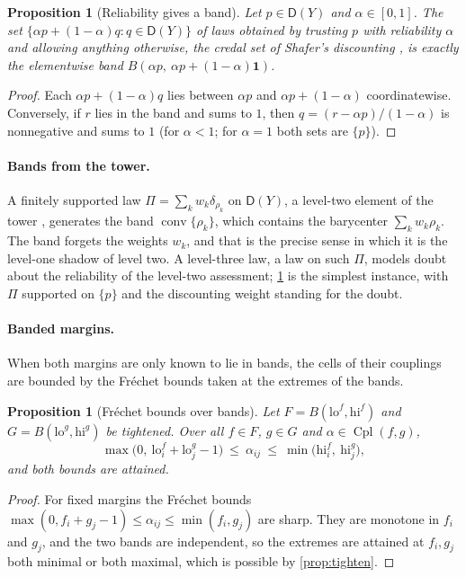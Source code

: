 \documentclass[11pt]{article}
\newtheorem{proposition}[theorem]{Proposition}
\theoremstyle{definition}
\theoremstyle{remark}
\newcommand{\D}{\mathsf{D}}
\newcommand{\Cpl}{\operatorname{Cpl}}
\begin{document}
\begin{proposition}[Reliability gives a band]\label{prop:discount}
Let $p\in\D(Y)$ and $\alpha\in[0,1]$. The set $\{\alpha p+(1-\alpha)q:q\in\D(Y)\}$ of laws obtained by trusting $p$ with
reliability $\alpha$ and allowing anything otherwise, the credal set of Shafer's discounting \cite{Shafer1976}, is exactly
the elementwise band $B(\alpha p,\ \alpha p+(1-\alpha)\mathbf 1)$.
\end{proposition}
\begin{proof}
Each $\alpha p+(1-\alpha)q$ lies between $\alpha p$ and $\alpha p+(1-\alpha)$ coordinatewise. Conversely, if $r$ lies in
the band and sums to $1$, then $q=(r-\alpha p)/(1-\alpha)$ is nonnegative and sums to $1$ (for $\alpha<1$; for $\alpha=1$ both
sets are $\{p\}$).
\end{proof}

\paragraph{Bands from the tower.} A finitely supported law $\Pi=\sum_kw_k\delta_{\rho_k}$ on $\D(Y)$, a level-two element of the
tower \cite{Tower}, generates the band $\operatorname{conv}\{\rho_k\}$, which contains the barycenter $\sum_kw_k\rho_k$. The
band forgets the weights $w_k$, and that is the precise sense in which it is the level-one shadow of level two. A level-three
law, a law on such $\Pi$, models doubt about the reliability of the level-two assessment; \cref{prop:discount} is the
simplest instance, with $\Pi$ supported on $\{p\}$ and the discounting weight standing for the doubt.

\paragraph{Banded margins.} When both margins are only known to lie in bands, the cells of their couplings are bounded by the
Fréchet bounds taken at the extremes of the bands.

\begin{proposition}[Fréchet bounds over bands]\label{prop:frechet}
Let $F=B(\mathrm{lo}^f,\mathrm{hi}^f)$ and $G=B(\mathrm{lo}^g,\mathrm{hi}^g)$ be tightened. Over all $f\in F$, $g\in G$ and
$\alpha\in\Cpl(f,g)$,
\[
\max\bigl(0,\ \mathrm{lo}^f_i+\mathrm{lo}^g_j-1\bigr)\ \le\ \alpha_{ij}\ \le\ \min\bigl(\mathrm{hi}^f_i,\ \mathrm{hi}^g_j\bigr),
\]
and both bounds are attained.
\end{proposition}
\begin{proof}
For fixed margins the Fréchet bounds $\max(0,f_i+g_j-1)\le\alpha_{ij}\le\min(f_i,g_j)$ are sharp. They are monotone in
$f_i$ and $g_j$, and the two bands are independent, so the extremes are attained at $f_i,g_j$ both minimal or both maximal,
which is possible by \cref{prop:tighten}.
\end{proof}
\end{document}
